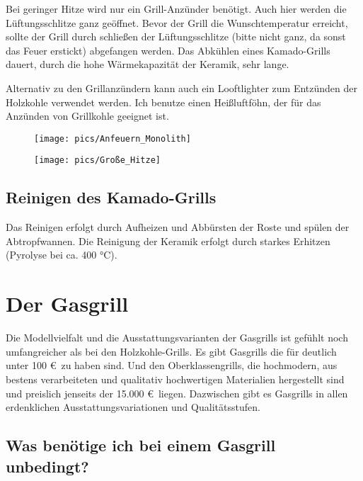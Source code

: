 	Bei geringer Hitze wird nur ein Grill-Anzünder benötigt. Auch hier werden die 
	Lüftungsschlitze ganz 
	geöffnet. Bevor der Grill die Wunschtemperatur erreicht, sollte der Grill durch 
	schließen der 
	Lüftungsschlitze (bitte nicht ganz, da sonst das Feuer erstickt) abgefangen 
	werden. Das Abkühlen eines 
	Kamado-Grills dauert, durch die hohe Wärmekapazität der Keramik, sehr lange.
	
	Alternativ zu den Grillanzündern kann auch ein Looftlighter zum Entzünden der 
	Holzkohle verwendet 
	werden. Ich benutze einen Heißluftföhn, der für das Anzünden von Grillkohle 
	geeignet ist.

\begin{figure}[htbp]
	\centering
	\begin{minipage}{.5\textwidth}
		\centering
		\texttt{[image: pics/Anfeuern\_Monolith]}
		\label{fig:Anfeuern}
	\end{minipage}%
	\begin{minipage}{.5\textwidth}
		\centering
		\texttt{[image: pics/Große\_Hitze]}
		\label{fig:Große}
	\end{minipage}%
\end{figure}

\subsection{Reinigen des Kamado-Grills}

	Das Reinigen erfolgt durch Aufheizen und Abbürsten der Roste und spülen der 
	Abtropfwannen. Die 
	Reinigung der Keramik erfolgt durch starkes Erhitzen (Pyrolyse bei ca. 400 °C).

\section{Der Gasgrill}

	Die Modellvielfalt und die Ausstattungsvarianten der Gasgrills ist gefühlt noch 
	umfangreicher als bei den 
	Holzkohle-Grills. Es gibt Gasgrills die für 
	deutlich unter 100 €\ zu haben sind. Und den Oberklassengrills, die 
	hochmodern, aus bestens 
	verarbeiteten und qualitativ hochwertigen Materialien
	hergestellt sind und preislich jenseits der 15.000 €\ liegen. Dazwischen gibt es 
	Gasgrills in allen 
	erdenklichen Ausstattungsvariationen und Qualitätsstufen. 

\subsection{Was benötige ich bei einem Gasgrill unbedingt?} 

